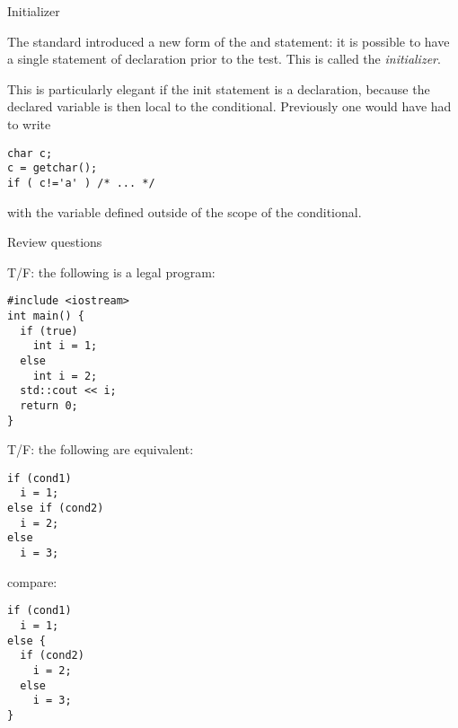  {Initializer}
\label{sec:if-init}

The  standard introduced a new form of the  and
 statement: it is possible to have a single
statement of declaration prior to the test.
This is called the
\emph{initializer}.


This is particularly elegant if the init statement is a declaration,
because the declared variable is then local to the conditional.
Previously one would have had to write
\begin{lstlisting}
char c;
c = getchar();
if ( c!='a' ) /* ... */
\end{lstlisting}
with the variable defined outside of the scope of the conditional.

 {Review questions}

\begin{review}
  T/F: the following is a legal program:
\begin{lstlisting}
#include <iostream>
int main() {
  if (true)
    int i = 1;
  else
    int i = 2;
  std::cout << i;
  return 0;
}
\end{lstlisting}
\end{review}

\begin{review}
  T/F: the following are equivalent:
  \begin{multicols}{2}
\begin{lstlisting}
if (cond1)
  i = 1;
else if (cond2)
  i = 2;
else
  i = 3;
\end{lstlisting}
\columnbreak
compare:
\begin{lstlisting}
if (cond1)
  i = 1;
else {
  if (cond2)
    i = 2;
  else
    i = 3;
}
\end{lstlisting}
\end{multicols}
\end{review}
